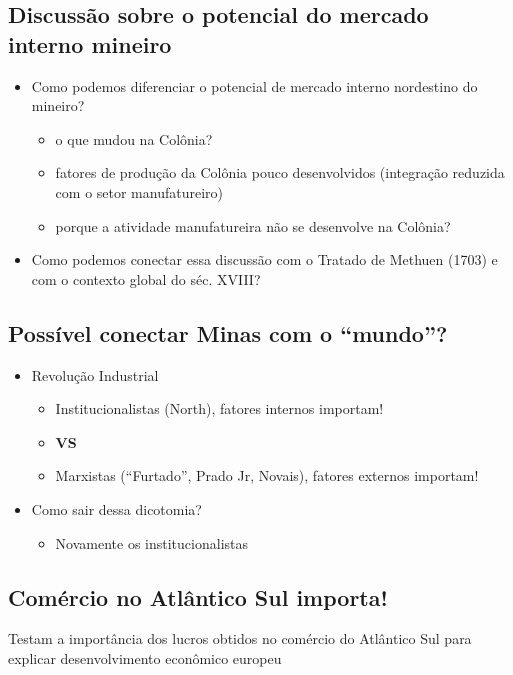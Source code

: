 \documentclass[a4paper,12pt]{article}[abntex2]
\begin{document}
\subsection{\textbf{Discussão sobre o potencial do mercado interno mineiro}}
\begin{itemize}
    \item Como podemos diferenciar o potencial de mercado interno nordestino do mineiro? \begin{itemize}
        \item o que mudou na Colônia?
        \item fatores de produção da Colônia pouco desenvolvidos (integração reduzida com o setor manufatureiro)
        \item porque a atividade manufatureira não se desenvolve na Colônia?
    \end{itemize}
    \item Como podemos conectar essa discussão com o Tratado de Methuen (1703) e com o contexto global do séc. XVIII?
\end{itemize}

\subsection{\textbf{Possível conectar Minas com o “mundo”?}}
\begin{itemize}
    \item Revolução Industrial \begin{itemize}
        \item Institucionalistas (North), fatores internos importam! 
        \item \textbf{VS}
        \item Marxistas (“Furtado”, Prado Jr, Novais), fatores externos importam!
    \end{itemize}
    \item Como sair dessa dicotomia? \begin{itemize}
        \item Novamente os institucionalistas
    \end{itemize}
\end{itemize}

\subsection{\textbf{Comércio no Atlântico Sul importa!}}

Testam a importância dos lucros obtidos no comércio do Atlântico Sul para explicar desenvolvimento econômico  europeu
\end{document}
